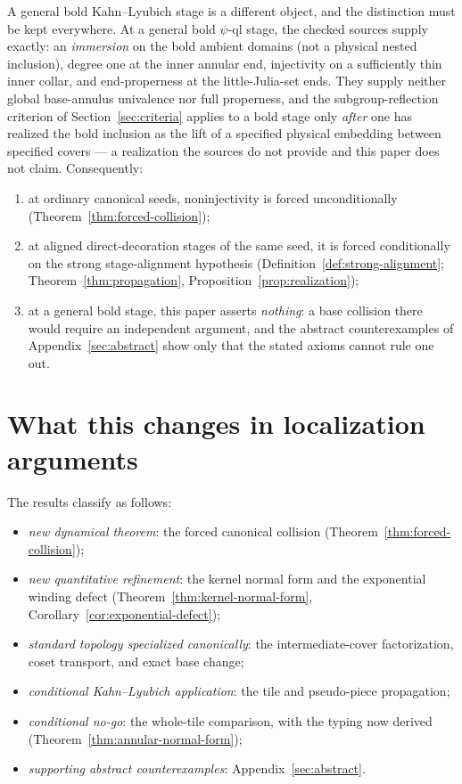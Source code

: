 \documentclass[11pt,reqno]{amsart}
\theoremstyle{definition}
\theoremstyle{remark}
\begin{document}
A general bold Kahn--Lyubich stage is a different object, and the
distinction must be kept everywhere.  At a general bold $\psi$-ql
stage, the checked sources supply exactly: an \emph{immersion} on the
bold ambient domains (not a physical nested inclusion), degree one at
the inner annular end, injectivity on a sufficiently thin inner collar,
and end-properness at the little-Julia-set ends.  They supply neither
global base-annulus univalence nor full properness, and the
subgroup-reflection criterion of Section~\ref{sec:criteria} applies to
a bold stage only \emph{after} one has realized the bold inclusion as
the lift of a specified physical embedding between specified covers ---
a realization the sources do not provide and this paper does not claim.
Consequently:
\begin{enumerate}
\item at ordinary canonical seeds, noninjectivity is forced
  unconditionally (Theorem~\ref{thm:forced-collision});
\item at aligned direct-decoration stages of the same seed, it is
  forced conditionally on the strong stage-alignment hypothesis
  (Definition~\ref{def:strong-alignment};
  Theorem~\ref{thm:propagation},
  Proposition~\ref{prop:realization});
\item at a general bold stage, this paper asserts \emph{nothing}: a
  base collision there would require an independent argument, and the
  abstract counterexamples of Appendix~\ref{sec:abstract} show only
  that the stated axioms cannot rule one out.
\end{enumerate}

\section{What this changes in localization arguments}
\label{sec:changes}

The results classify as follows:
\begin{itemize}
\item \emph{new dynamical theorem}: the forced canonical collision
  (Theorem~\ref{thm:forced-collision});
\item \emph{new quantitative refinement}: the kernel normal form and
  the exponential winding defect
  (Theorem~\ref{thm:kernel-normal-form},
  Corollary~\ref{cor:exponential-defect});
\item \emph{standard topology specialized canonically}: the
  intermediate-cover factorization, coset transport, and exact base
  change;
\item \emph{conditional Kahn--Lyubich application}: the tile and
  pseudo-piece propagation;
\item \emph{conditional no-go}: the whole-tile comparison, with the
  typing now derived (Theorem~\ref{thm:annular-normal-form});
\item \emph{supporting abstract counterexamples}:
  Appendix~\ref{sec:abstract}.
\end{itemize}
\end{document}
